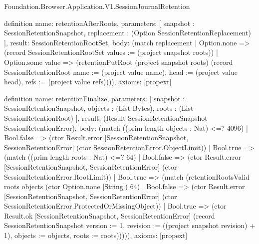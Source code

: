 \begin{lexlean}{Foundation.Browser.Application.V1.SessionJournalRetention}
\begin{semanticmodule}
definition{
  name: retentionAfterRoots,
  parameters: [
    snapshot : SessionRetentionSnapshot,
    replacement : (Option SessionRetentionReplacement)
  ],
  result: SessionRetentionRootSet,
  body: (match replacement
    | Option.none => (record SessionRetentionRootSet {values := (project snapshot roots)})
    | Option.some value => (retentionPutRoot (project snapshot roots) (record SessionRetentionRoot {name := (project value name), head := (project value head), refs := (project value refs)}))),
  axioms: [propext]
}

definition{
  name: retentionFinalize,
  parameters: [
    snapshot : SessionRetentionSnapshot,
    objects : (List Bytes),
    roots : (List SessionRetentionRoot)
  ],
  result: (Result SessionRetentionSnapshot SessionRetentionError),
  body: (match ((prim length objects : Nat) <=? 4096)
    | Bool.false => (ctor Result.error [SessionRetentionSnapshot, SessionRetentionError] (ctor SessionRetentionError.ObjectLimit))
    | Bool.true => (match ((prim length roots : Nat) <=? 64)
      | Bool.false => (ctor Result.error [SessionRetentionSnapshot, SessionRetentionError] (ctor SessionRetentionError.RootLimit))
      | Bool.true => (match (retentionRootsValid roots objects (ctor Option.none [String]) 64)
        | Bool.false => (ctor Result.error [SessionRetentionSnapshot, SessionRetentionError] (ctor SessionRetentionError.ProtectedOrMissingObject))
        | Bool.true => (ctor Result.ok [SessionRetentionSnapshot, SessionRetentionError] (record SessionRetentionSnapshot {version := 1, revision := ((project snapshot revision) + 1), objects := objects, roots := roots}))))),
  axioms: [propext]
}


\end{semanticmodule}
\end{lexlean}

